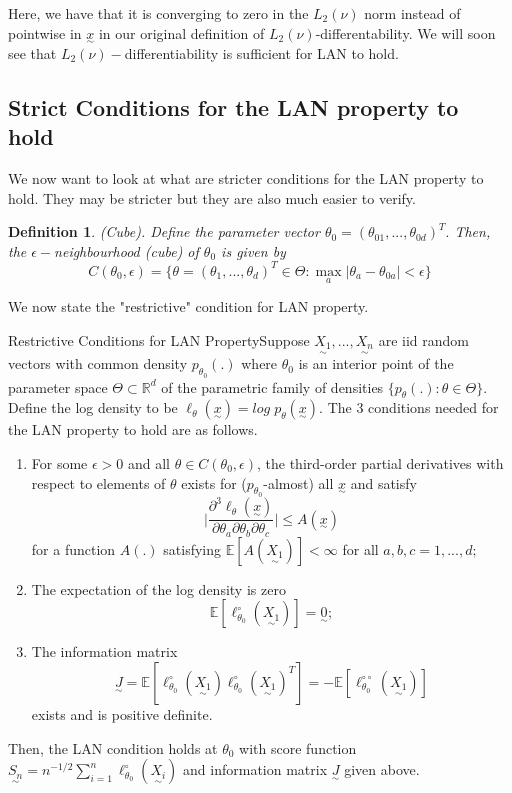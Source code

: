 \documentclass[twoside]{article}
\newtheorem{definition}[theorem]{Definition}
\newcommand{\utilde}{\underset{\sim}}
\begin{document}
Here, we have that it is converging to zero in the $L_2(\nu)$ norm instead of pointwise in $\utilde{x}$ in our original definition of $L_2(\nu)$-differentability. We will soon see that $L_2(\nu)-$differentiability is sufficient for LAN to hold.

\newpage
\subsection{Strict Conditions for the LAN property to hold}
We now want to look at what are stricter conditions for the LAN property to hold. They may be stricter but they are also much easier to verify.

\begin{definition}(Cube). Define the parameter vector $\theta_0 = (\theta_{01},...,\theta_{0d})^T.$ Then, the $\epsilon-$neighbourhood (cube) of $\theta_0$ is given by 
$$
C(\theta_0, \epsilon) = \{\theta = (\theta_1,...,\theta_d)^T \in \Theta: \max_{a}|\theta_a - \theta_{0 a}| < \epsilon \}
$$
\end{definition}

We now state the "restrictive" condition for LAN property.
\begin{proposition_exam}{Restrictive Conditions for LAN Property}{}Suppose $\utilde{X_1},...,\utilde{X_n}$ are iid random vectors with common density $p_{\theta_{0}}(.)$ where $\theta_0$ is an interior point of the parameter space $\Theta \subset \mathbb{R}^d$ of the parametric family of densities $\{p_{\theta}(.): \theta \in \Theta \}.$ Define the log density to be $\ell_{\theta}(\utilde{x}) = log\;p_{\theta}(\utilde{x}).$ The 3 conditions needed for the LAN property to hold are as follows.
\begin{enumerate}
\item For some $\epsilon > 0$ and all $\theta \in C(\theta_0, \epsilon)$, the third-order partial derivatives with respect to elements of $\theta$ exists for ($p_{\theta_0}$-almost) all $\utilde{x}$ and satisfy 
$$
\bigg|\frac{\partial^3 \ell_{\theta}(\utilde{x})}{\partial \theta_{a}\partial \theta_{b}\partial \theta_{c}} \bigg| \leq A(\utilde{x})
$$
for a function $A(.)$ satisfying $\mathbb{E}[A(\utilde{X_1})] < \infty$ for all $a,b,c = 1,...,d;$
\item The expectation of the log density is zero 
$$
\mathbb{E}[\ell_{\theta_{0}}^{\circ}(\utilde{X_1})] = \utilde{0};
$$
\item The information matrix 
$$
\utilde{J} = \mathbb{E}[\ell_{\theta_{0}}^{\circ}(\utilde{X_1})\ell_{\theta_{0}}^{\circ}(\utilde{X_1})^T] = -\mathbb{E}[\ell_{\theta_{0}}^{\circ \circ}(\utilde{X_1})]
$$
exists and is positive definite.
\end{enumerate}
Then, the LAN condition holds at $\theta_0$ with score function $\utilde{S_n} = n^{-1/2}\sum_{i=1}^{n}\ell_{\theta_{0}}^{\circ}(\utilde{X_i})$ and information matrix $\utilde{J}$ given above.
\end{proposition_exam}
\end{document}
